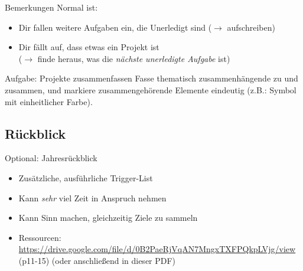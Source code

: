 \begin{frame}[c]{Bemerkungen}
    \large
    Normal ist:
    \begin{itemize}[<+(1)->]
        \item Dir fallen weitere Aufgaben ein, die Unerledigt sind ($\rightarrow$ aufschreiben)
        \item Dir fällt auf, dass etwas ein Projekt ist \\ ($\rightarrow$ finde heraus, was die {\em nächste unerledigte Aufgabe} ist)
    \end{itemize}
\end{frame}


\begin{frame}[c]
    \large
    \begin{block}{Aufgabe: Projekte zusammenfassen}
    Fasse thematisch zusammenhängende  zu  und
     zusammen, und markiere zusammengehörende Elemente
    eindeutig (z.B.: Symbol mit einheitlicher Farbe).
    \end{block}
\end{frame}

\fpause


\subsection{Rückblick}

\begin{frame}[c]{Optional: Jahresrückblick}
    \begin{itemize}[<+(1)->]
        \item Zusätzliche, ausführliche Trigger-List
        \item Kann {\em sehr} viel Zeit in Anspruch nehmen
        \item Kann Sinn machen, gleichzeitig Ziele zu sammeln
        \item Ressourcen: \url{https://drive.google.com/file/d/0B2PaeRjVqAN7MngxTXFPQkpLVjg/view} \cite{8760-hours} (p11-15) (oder anschließend in dieser PDF)
    \end{itemize}
\end{frame}

% 
% 
{
    \addtocounter{framenumber}{5}
    
}

\fpause

